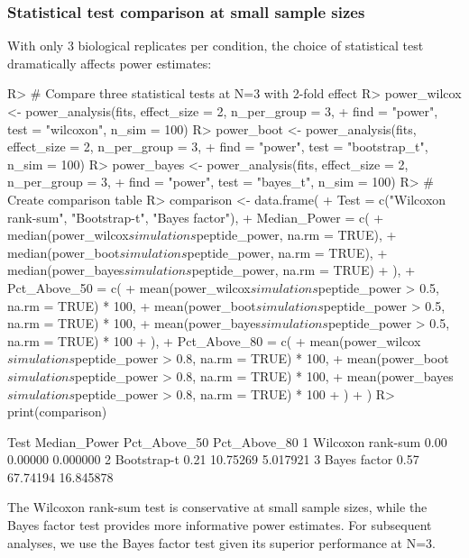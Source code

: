 \documentclass[article]{jss}
\begin{document}
\subsubsection{Statistical test comparison at small sample sizes}

With only 3 biological replicates per condition, the choice of statistical test dramatically affects power estimates:

\begin{Schunk}
\begin{Sinput}
R> # Compare three statistical tests at N=3 with 2-fold effect
R> power_wilcox <- power_analysis(fits, effect_size = 2, n_per_group = 3,
+                                 find = "power", test = "wilcoxon", n_sim = 100)
R> power_boot <- power_analysis(fits, effect_size = 2, n_per_group = 3,
+                               find = "power", test = "bootstrap_t", n_sim = 100)
R> power_bayes <- power_analysis(fits, effect_size = 2, n_per_group = 3,
+                                find = "power", test = "bayes_t", n_sim = 100)
R> # Create comparison table
R> comparison <- data.frame(
+    Test = c("Wilcoxon rank-sum", "Bootstrap-t", "Bayes factor"),
+    Median_Power = c(
+      median(power_wilcox$simulations$peptide_power, na.rm = TRUE),
+      median(power_boot$simulations$peptide_power, na.rm = TRUE),
+      median(power_bayes$simulations$peptide_power, na.rm = TRUE)
+    ),
+    Pct_Above_50 = c(
+      mean(power_wilcox$simulations$peptide_power > 0.5, na.rm = TRUE) * 100,
+      mean(power_boot$simulations$peptide_power > 0.5, na.rm = TRUE) * 100,
+      mean(power_bayes$simulations$peptide_power > 0.5, na.rm = TRUE) * 100
+    ),
+    Pct_Above_80 = c(
+      mean(power_wilcox$simulations$peptide_power > 0.8, na.rm = TRUE) * 100,
+      mean(power_boot$simulations$peptide_power > 0.8, na.rm = TRUE) * 100,
+      mean(power_bayes$simulations$peptide_power > 0.8, na.rm = TRUE) * 100
+    )
+  )
R> print(comparison)
\end{Sinput}
\begin{Soutput}
               Test Median_Power Pct_Above_50 Pct_Above_80
1 Wilcoxon rank-sum         0.00      0.00000     0.000000
2       Bootstrap-t         0.21     10.75269     5.017921
3      Bayes factor         0.57     67.74194    16.845878
\end{Soutput}
\end{Schunk}

The Wilcoxon rank-sum test is conservative at small sample sizes, while the Bayes factor test provides more informative power estimates. For subsequent analyses, we use the Bayes factor test given its superior performance at N=3.
\end{document}
